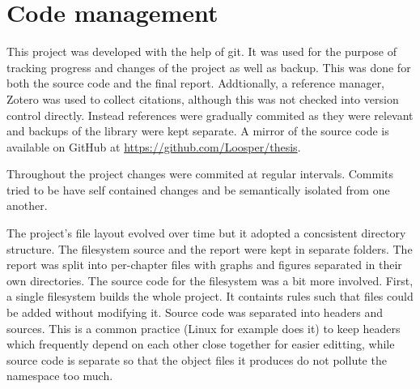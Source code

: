     \section{Code management}

        This project was developed with the help of git. It was used for the
        purpose of tracking progress and changes of the project as well as
        backup. This was done for both the source code and the final report.
        Addtionally, a reference manager, Zotero \cite{zotero} was used to
        collect citations, although this was not checked into version control
        directly. Instead references were gradually commited as they were
        relevant and backups of the library were kept separate. A mirror of
        the source code is available on GitHub at \url{https://github.com/Loosper/thesis}.

        Throughout the project changes were commited at regular intervals.
        Commits tried to be have self contained changes and be semantically
        isolated from one another.

        The project's file layout evolved over time but it adopted a
        concsistent directory structure. The filesystem source and the report
        were kept in separate folders. The report was split into per-chapter
        files with graphs and figures separated in their own directories. The
        source code for the filesystem was a bit more involved. First, a single
        filesystem builds the whole project. It containts rules such that files
        could be added without modifying it. Source code was separated into
        headers and sources. This is a common practice (Linux
        for example does it) to keep headers which
        frequently depend on each other close together for easier editting,
        while source code is separate so that the object files it produces do
        not pollute the namespace too much.
